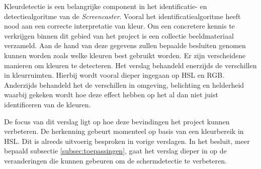 
Kleurdetectie is een belangrijke component in het identificatie- en detectiealgoritme van de {\it Screencaster}. Vooral het identificatiealgoritme heeft nood aan een correcte interpretatie van kleur. Om een concretere kennis te verkrijgen binnen dit gebied van het project is een collectie beeldmateriaal verzameld. Aan de hand van deze gegevens zullen bepaalde besluiten genomen kunnen worden zoals welke kleuren best gebruikt worden. Er zijn verscheidene manieren om kleuren te detecteren. Het verslag behandeld enerzijds de verschillen in kleurruimten. Hierbij wordt vooral dieper ingegaan op HSL en RGB. Anderzijds behandeld het de verschillen in omgeving, belichting en helderheid waarbij gekeken wordt hoe deze effect hebben op het al dan niet juist identificeren van de kleuren.

De focus van dit verslag ligt op hoe deze bevindingen het project kunnen verbeteren. De herkenning gebeurt momenteel op basis van een kleurbereik in HSL. Dit is alreeds uitvoerig besproken in vorige verslagen. In het besluit, meer bepaald subsectie \ref{subsec:toepassingen}, gaat het verslag dieper in op de veranderingen die kunnen gebeuren om de schermdetectie te verbeteren.